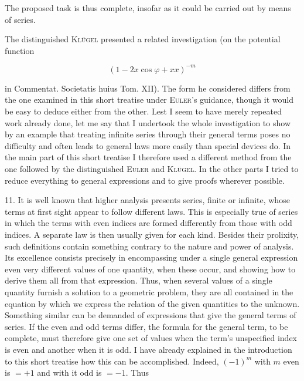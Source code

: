 The proposed task is thus complete, insofar as it could be carried out by means of series.

The distinguished \textsc{Kl\"ugel} presented a related investigation (on the potential function

\[
(1-2x\cos\varphi+xx)^{-m}
\]

\noindent in Commentat. Societatis huius Tom. XII). The form he considered
differs from the one examined in this short treatise under \textsc{Euler}'s guidance,
though it would be easy to deduce either from the other. Lest I seem to have
merely repeated work already done, let me say that I undertook the whole investigation
to show by an example that treating infinite series through their general terms poses no difficulty
and often leads to general laws more easily than special devices do.
In the main part of this short treatise I therefore used a different method
from the one followed by the distinguished \textsc{Euler} and \textsc{Kl\"ugel}. In the other parts I tried to reduce everything to general expressions
and to give proofs wherever possible.


11. It is well known that higher analysis presents series, finite or infinite, whose terms
at first sight appear to follow different laws. This is especially true of series in
which the terms with even indices are formed differently from those with odd indices.
A separate law is then usually given for each kind. Besides their prolixity, such
definitions contain something contrary to the nature and power of analysis. Its excellence
consists precisely in encompassing under a single general expression even very different
values of one quantity, when these occur, and showing how to derive them all from that expression.
Thus, when several values of a single quantity furnish a solution to a geometric problem,
they are all contained in the equation by which we express the relation of the given quantities
to the unknown. Something similar can be demanded of expressions that give the
general terms of series. If the even and
odd terms differ, the formula for the general term, to be complete, must therefore
give one set of values when the term's unspecified index is even and another when it is
odd. I have already explained in the introduction to this short treatise how this can
be accomplished. Indeed, $(-1)^m$ with $m$ even is $=+1$ and with it odd is $=-1$. Thus
